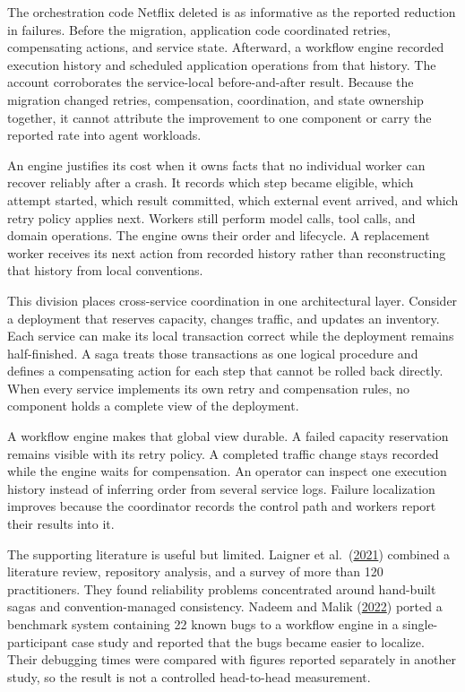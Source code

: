 The orchestration code Netflix deleted is as informative as the reported reduction in failures. Before the migration, application code coordinated retries, compensating actions, and service state. Afterward, a workflow engine recorded execution history and scheduled application operations from that history. The account corroborates the service-local before-and-after result. Because the migration changed retries, compensation, coordination, and state ownership together, it cannot attribute the improvement to one component or carry the reported rate into agent workloads.

An engine justifies its cost when it owns facts that no individual worker can recover reliably after a crash. It records which step became eligible, which attempt started, which result committed, which external event arrived, and which retry policy applies next. Workers still perform model calls, tool calls, and domain operations. The engine owns their order and lifecycle. A replacement worker receives its next action from recorded history rather than reconstructing that history from local conventions.

This division places cross-service coordination in one architectural layer. Consider a deployment that reserves capacity, changes traffic, and updates an inventory. Each service can make its local transaction correct while the deployment remains half-finished. A saga treats those transactions as one logical procedure and defines a compensating action for each step that cannot be rolled back directly. When every service implements its own retry and compensation rules, no component holds a complete view of the deployment.

A workflow engine makes that global view durable. A failed capacity reservation remains visible with its retry policy. A completed traffic change stays recorded while the engine waits for compensation. An operator can inspect one execution history instead of inferring order from several service logs. Failure localization improves because the coordinator records the control path and workers report their results into it.

The supporting literature is useful but limited. Laigner et al.~(\href{https://arxiv.org/abs/2103.00170}{2021}) combined a literature review, repository analysis, and a survey of more than 120 practitioners. They found reliability problems concentrated around hand-built sagas and convention-managed consistency. Nadeem and Malik (\href{https://arxiv.org/abs/2204.07210}{2022}) ported a benchmark system containing 22 known bugs to a workflow engine in a single-participant case study and reported that the bugs became easier to localize. Their debugging times were compared with figures reported separately in another study, so the result is not a controlled head-to-head measurement.

